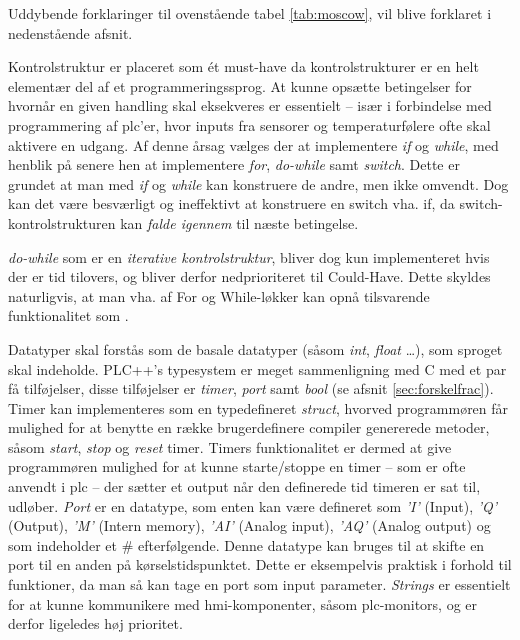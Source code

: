 \noindent Uddybende forklaringer til ovenstående tabel \ref{tab:moscow}, vil blive forklaret i nedenstående afsnit.

Kontrolstruktur er placeret som ét must-have da kontrolstrukturer er en helt elementær del af et programmeringssprog. At kunne opsætte betingelser for hvornår en given handling skal eksekveres er essentielt – især i forbindelse med programmering af \gls{plc}’er, hvor inputs fra sensorer og temperaturfølere ofte skal aktivere en udgang. 
Af denne årsag vælges der at implementere \textit{if} og \textit{while}, med henblik på senere hen at implementere \textit{for}, \textit{do-while} samt \textit{switch}. Dette er grundet at man med \textit{if} og \textit{while} kan konstruere de andre, men ikke omvendt. Dog kan det være besværligt og ineffektivt at konstruere en switch vha. if, da switch-kontrolstrukturen kan \textit{falde igennem} til næste betingelse.

\textit{do-while} som er en \textit{iterative kontrolstruktur}, bliver dog kun implementeret hvis der er tid tilovers, og bliver derfor nedprioriteret til Could-Have. Dette skyldes naturligvis, at man vha. af For og While-løkker kan opnå tilsvarende funktionalitet som .

Datatyper skal forstås som de basale datatyper (såsom \textit{int}, \textit{float} …), som sproget skal indeholde. PLC++'s typesystem er meget sammenligning med C med et par få tilføjelser, disse tilføjelser er \textit{timer}, \textit{port} samt \textit{bool} (se afsnit \ref{sec:forskelfrac}).
Timer kan implementeres som en typedefineret \textit{struct}, hvorved programmøren får mulighed for at benytte en række brugerdefinere compiler genererede metoder, såsom \textit{start}, \textit{stop} og \textit{reset} timer. Timers funktionalitet er dermed at give programmøren mulighed for at kunne starte/stoppe en timer – som er ofte anvendt i \gls{plc} – der sætter et output når den definerede tid timeren er sat til, udløber.
\textit{Port} er en datatype, som enten kan være defineret som \textit{'I'} (Input), \textit{'Q'} (Output), \textit{'M'} (Intern memory), \textit{'AI'} (Analog input), \textit{'AQ'} (Analog output) og som indeholder et \# efterfølgende. Denne datatype kan bruges til at skifte en port til en anden på kørselstidspunktet. Dette er eksempelvis praktisk i forhold til funktioner, da man så kan tage en port som input parameter.
\textit{Strings} er essentielt for at kunne kommunikere med \gls{hmi}-komponenter, såsom \gls{plc}-monitors, og er derfor ligeledes høj prioritet. 


